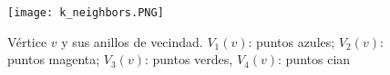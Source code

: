 \documentclass[conference]{IEEEtran}
\begin{document}
\begin{figure}
\texttt{[image: k\_neighbors.PNG]}
\caption{Vértice $v$ y sus anillos de vecindad. $V_{1}(v)$: puntos azules; $V_{2}(v)$: puntos magenta; $V_{3}(v)$: puntos verdes, $V_{4}(v)$: puntos cian \cite{gmsr}}
\label{fig:k_rings}
\end{figure}



 






%
%

\end{document}
